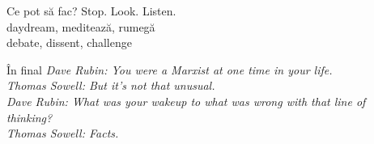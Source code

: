 \documentclass{simple}
\begin{document}
\begin{frame}{Ce pot să fac?}
  \centering
  \Large
  \pause Stop. Look. Listen. \\
  \pause daydream, meditează, rumegă \\
  \pause debate, dissent, challenge \\
\end{frame}

\begin{frame}{În final}
  \pause \textit{Dave Rubin: You were a Marxist at one time in your life.} \\
  \pause \textit{Thomas Sowell: But it's not that unusual.} \\
  \pause \textit{Dave Rubin: What was your wakeup to what was wrong with that line of thinking?} \\
  \pause \textit{Thomas Sowell: Facts.} \\
\end{frame}
\end{document}
